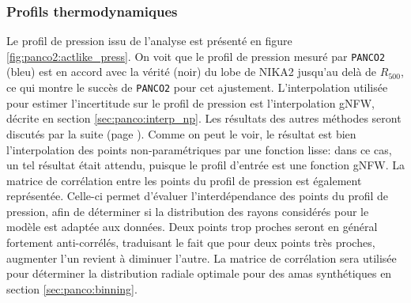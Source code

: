 \subsubsection{Profils thermodynamiques} %
Le profil de pression issu de l'analyse est présenté en figure \ref{fig:panco2:actlike_press}.
On voit que le profil de pression mesuré par \texttt{PANCO2} (bleu) est en accord avec la vérité (noir) du lobe de NIKA2 jusqu'au delà de $R_{500}$, ce qui montre le succès de \texttt{PANCO2} pour cet ajustement.
L'interpolation utilisée pour estimer l'incertitude sur le profil de pression est l'interpolation gNFW, décrite en section \ref{sec:panco:interp_np}.
Les résultats des autres méthodes seront discutés par la suite (page \pageref{sec:panco:interp_np_results}).
Comme on peut le voir, le résultat est bien l'interpolation des points non-paramétriques par une fonction lisse: dans ce cas, un tel résultat était attendu, puisque le profil d'entrée est une fonction gNFW.
La matrice de corrélation entre les points du profil de pression est également représentée.
Celle-ci permet d'évaluer l'interdépendance des points du profil de pression, afin de déterminer si la distribution des rayons considérés pour le modèle est adaptée aux données.
Deux points trop proches seront en général fortement anti-corrélés, traduisant le fait que pour deux points très proches, augmenter l'un revient à diminuer l'autre.
La matrice de corrélation sera utilisée pour déterminer la distribution radiale optimale pour des amas synthétiques en section \ref{sec:panco:binning}.

